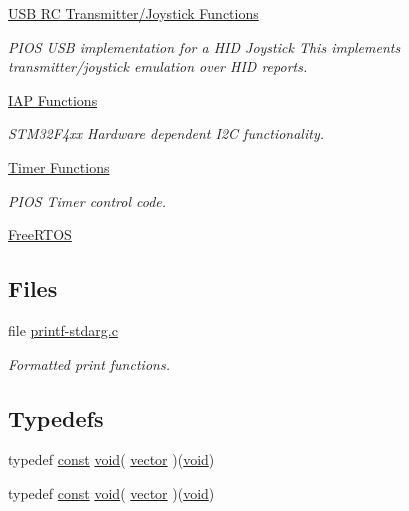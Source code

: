 \begin{DoxyCompactItemize}
\hyperlink{group___p_i_o_s___u_s_b___r_c_t_x}{U\-S\-B R\-C Transmitter/\-Joystick Functions}
\begin{DoxyCompactList}\small\item\em P\-I\-O\-S U\-S\-B implementation for a H\-I\-D Joystick  This implements transmitter/joystick emulation over H\-I\-D reports. \end{DoxyCompactList}\item 
\hyperlink{group___p_i_o_s___i_a_p}{I\-A\-P Functions}
\begin{DoxyCompactList}\small\item\em S\-T\-M32\-F4xx Hardware dependent I2\-C functionality. \end{DoxyCompactList}\item 
\hyperlink{group___p_i_o_s___t_i_m}{Timer Functions}
\begin{DoxyCompactList}\small\item\em P\-I\-O\-S Timer control code. \end{DoxyCompactList}\item 
\hyperlink{group___free_r_t_o_s}{Free\-R\-T\-O\-S}
\end{DoxyCompactItemize}
\subsection*{Files}
\begin{DoxyCompactItemize}
\item 
file \hyperlink{printf-stdarg_8c}{printf-\/stdarg.\-c}
\begin{DoxyCompactList}\small\item\em Formatted print functions. \end{DoxyCompactList}\end{DoxyCompactItemize}
\subsection*{Typedefs}
\begin{DoxyCompactItemize}
\item 
typedef \hyperlink{group___n_a_m_e_ga7ae6d0e43244213b34de2c2b9aa30da6}{const} \hyperlink{group___n_a_m_e_ga18028b8badbf1ea7e704ccac3c488e82}{void}( \hyperlink{group___p_i_o_s_ga3c46a32d92954306e54f6e9acdd9eaac}{vector} )(\hyperlink{group___n_a_m_e_ga18028b8badbf1ea7e704ccac3c488e82}{void})
\item 
typedef \hyperlink{group___n_a_m_e_ga7ae6d0e43244213b34de2c2b9aa30da6}{const} \hyperlink{group___n_a_m_e_ga18028b8badbf1ea7e704ccac3c488e82}{void}( \hyperlink{group___p_i_o_s_ga3c46a32d92954306e54f6e9acdd9eaac}{vector} )(\hyperlink{group___n_a_m_e_ga18028b8badbf1ea7e704ccac3c488e82}{void})
\end{DoxyCompactItemize}
